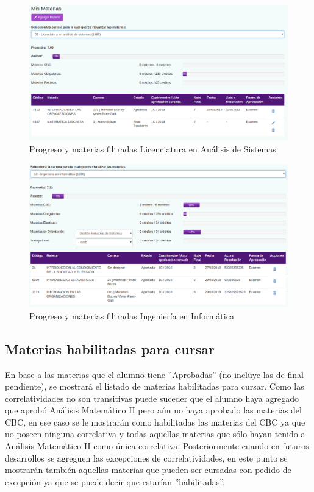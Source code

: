 \documentclass[a4paper]{article}
\begin{document}
\begin{figure}[H]
\centering
\includegraphics[scale=0.35]{Imagenes/progreso_licenciatura.png}\par
\caption{Progreso y materias filtradas Licenciatura en Análisis de Sistemas}
\end{figure}

\begin{figure}[H]
\centering
\includegraphics[scale=0.35]{Imagenes/progreso_informatica.png}\par
\caption{Progreso y materias filtradas Ingeniería en Informática}
\end{figure}

\subsection{Materias habilitadas para cursar}

En base a las materias que el alumno tiene ''Aprobadas'' (no incluye las de final pendiente), se mostrará el listado de materias habilitadas para cursar. Como las correlatividades no son transitivas puede suceder que el alumno haya agregado que aprobó Análisis Matemático II pero aún no haya aprobado las materias del CBC, en ese caso se le mostrarán como habilitadas las materias del CBC ya que no poseen ninguna correlativa y todas aquellas materias que sólo hayan tenido a Análisis Matemático II como única correlativa. Posteriormente cuando en futuros desarrollos se agreguen las excepciones de correlatividades, en este punto se mostrarán también aquellas materias que pueden ser cursadas con pedido de excepción ya que se puede decir que estarían ''habilitadas''.
\end{document}

